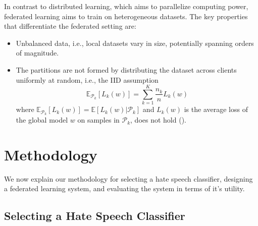 \documentclass[letterpaper]{article} %
\begin{document}
In contrast to distributed learning, which aims to parallelize computing power, federated learning aims to train on heterogeneous datasets. The key properties that differentiate the federated setting are: 
\begin{itemize}
\item Unbalanced data, i.e., local datasets vary in size, potentially spanning orders of magnitude.
\item 
The partitions are not formed by distributing the dataset across clients uniformly at random, i.e., the IID assumption
\begin{equation}
\mathbb{E}_{\mathcal{P}_k}[L_k(w)] = \sum_{k=1}^K \frac{n_k}{n} L_k(w)
\end{equation}
where $\mathbb{E}_{\mathcal{P}_k}[L_k(w)] = \mathbb{E}[L_k(w) | \mathcal{P}_k]$ and $L_k(w)$ is the average loss of the global model $w$ on samples in $\mathcal{P}_k$, does not hold ().
\end{itemize}
\bigskip
\section{Methodology}

We now explain our methodology for selecting a hate speech classifier, designing a federated learning system, and evaluating the system in terms of it's utility.

\subsection{Selecting a Hate Speech Classifier}
\end{document}
